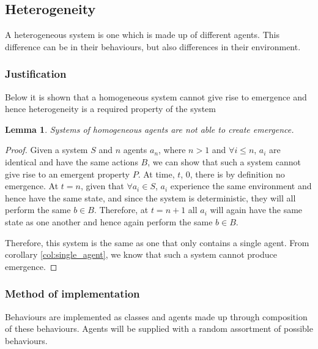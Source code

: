 \documentclass{article}
\newtheorem{lemma}[theorem]{Lemma}
\begin{document}
  \subsection{Heterogeneity}
  \label{sec: hetro}
  
    A heterogeneous system is one which is made up of different agents. This difference can be in their behaviours, but also differences in their environment. 


    \subsubsection{Justification}

      Below it is shown that a homogeneous system cannot give rise to emergence and hence heterogeneity is a required property of the system
        
      
      \begin{lemma}
        Systems of homogeneous agents are not able to create emergence. 
      \end{lemma}
      \begin{proof}

        Given a system $S$ and $n$ agents $a_n$, where $n > 1$ and $\forall i \leq n$, $a_i$ are identical and have the same actions $B$, we can show that such a system cannot give rise to an emergent property $P$. At time, $t$, 0, there is by definition no emergence. At $t=n$, given that $\forall a_i \in S$, $a_i$ experience the same environment and hence have the same state, and since the system is deterministic, they will all perform the same $b \in B$. Therefore, at $t=n+1$ all $a_i$ will again have the same state as one another and hence again perform the same $b \in B$.

        Therefore, this system is the same as one that only contains a single agent. From corollary \ref{col:single_agent}, we know that such a system cannot produce emergence.

      \end{proof}

    \subsubsection{Method of implementation}
      
      Behaviours are implemented as classes and agents made up through composition of these behaviours. Agents will be supplied with a random assortment of possible behaviours.
\end{document}
